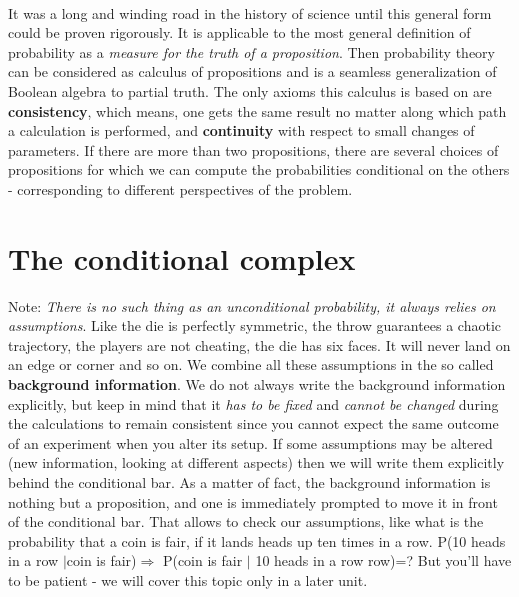 \documentclass[12pt, a4paper]{scrartcl}
\begin{document}
\\

It was a long and winding road in the history of science until this general form could be proven rigorously.
It is applicable to the most general definition of probability as a \textit{measure for the truth of a proposition}.
Then probability theory can be considered as calculus of propositions and is a seamless generalization of Boolean algebra to partial truth.
The only axioms this calculus is based on are  \textbf{consistency}, which means, one gets the same result no matter along which path a calculation is performed, and  \textbf{continuity} with respect to small changes of parameters.
If there are more than two propositions, there are several choices of propositions for which we can compute the probabilities conditional on the others - corresponding to different perspectives of the problem.\\

\section*{The conditional complex}
Note: \textit{There is no such thing as an unconditional probability, it always relies on assumptions}.
Like the die is perfectly symmetric, the throw guarantees a chaotic trajectory, the players are not cheating, the die has six faces. It will never land on an edge or corner and so on.
We combine all these assumptions in the so called  \textbf{background information}.
We do not always write the background information explicitly, but keep in mind that it \textit{has to be fixed} and \textit{cannot be changed} during the calculations to remain consistent since you cannot expect the same outcome of an experiment when you alter its setup.
If some assumptions may be altered (new information, looking at different aspects) then we will write them explicitly behind the conditional bar. 
As a matter of fact, the background information is nothing but a proposition, and one is immediately prompted to move it in front of the conditional bar. 
That allows to check our assumptions, like what is the probability that a coin is fair, if it lands heads up ten times in a row. P(10 heads in a row $|$coin is  fair)$ \Rightarrow$ P(coin is fair $|$ 10 heads in a row row)=?
But you'll have to be patient - we will cover this topic only in a later unit.\\
\end{document}
